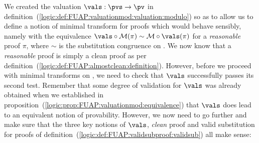 We created the valuation $\vals:\pvs\to\pv$ in
definition~(\ref{logic:def:FUAP:valuationmod:valuation:modulo}) so
as to allow us to define a notion of minimal transform for proofs
which would behave sensibly, namely with the equivalence
$\vals\circ{\cal M}(\pi)\sim{\cal M}\circ\vals(\pi)$ for a {\em
reasonable} proof $\pi$, where $\sim$ is the substitution congruence
on \pvb. We now know that a {\em reasonable} proof is simply a clean
proof as per
definition~(\ref{logic:def:FUAP:almostclean:definition}).  However,
before we proceed with minimal transforms on \pvs, we need to check
that $\vals$ successfully passes its second test. Remember that some
degree of validation for $\vals$ was already obtained when we
established in
proposition~(\ref{logic:prop:FUAP:valuationmod:equivalence}) that
$\vals$ does lead to an equivalent notion of provability. However,
we now need to go further and make sure that the three key notions
of $\vals$, {\em clean} proof and valid substitution for proofs of
definition~(\ref{logic:def:FUAP:validsubproof:validsub}) all make
sense:

